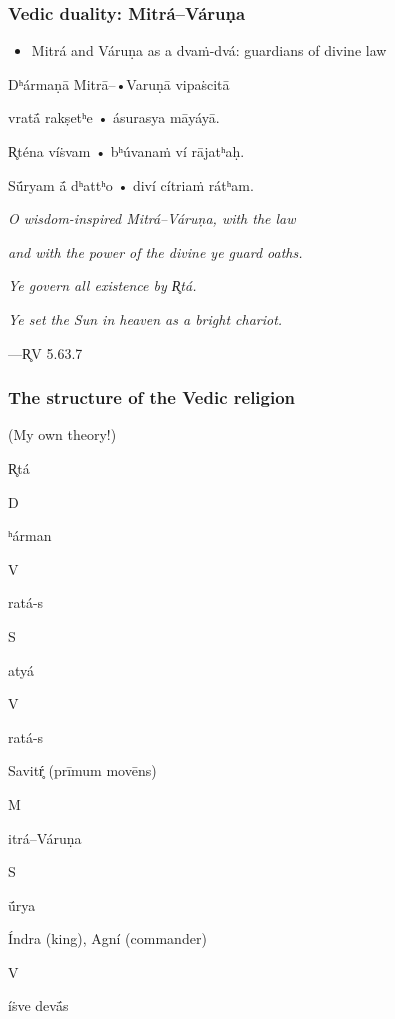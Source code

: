 \documentclass[pdf]{beamer}
\newcommand{\Subitem}[1]{{\setlength\itemindent{12pt} \item[-] #1}}
\newcommand{\Subsubitem}[1]{{\setlength\itemindent{24pt} \item[○] #1}}
\begin{document}
\begin{frame} \frametitle{Vedic duality: Mitrá--Váruṇa}
\begin{itemize}
	\item Mitrá and Váruṇa as a dvaṁ-dvá: guardians of divine law
\end{itemize}
\begin{center}
	Dʰármaṇā Mitrā--•Varuṇā vipaṡcitā

	vratā́ rakṣetʰe • ásurasya māyáyā.

	R̥téna víṡvam • bʰúvanaṁ ví rājatʰaḥ.

	Sū́ryam ā́ dʰattʰo • diví cítriaṁ rátʰam.

	\vspace{12pt}

	\textit{O wisdom-inspired Mitrá--Váruṇa, with the law}

	\textit{and with the power of the divine ye guard oaths.}

	\textit{Ye govern all existence by R̥tá.}

	\textit{Ye set the Sun in heaven as a bright chariot.}

	\vspace{12pt}

 	---R̥V 5.63.7
\end{center}
\end{frame}

\begin{frame} \frametitle{The structure of the Vedic religion}
(My own theory!)
\begin{itemize}
	\item R̥tá 
	\Subitem Dʰárman
	\Subsubitem Vratá-s
	\Subitem Satyá
	\Subsubitem Vratá-s
\end{itemize}
\begin{itemize}
	\item Savitŕ̥ (prīmum movēns)
	\Subitem Mitrá--Váruṇa
	\Subsubitem Sū́rya
	\item Índra (king), Agní (commander)
	\Subitem Víṡve devā́s
\end{itemize}
\end{frame}
\end{document}
